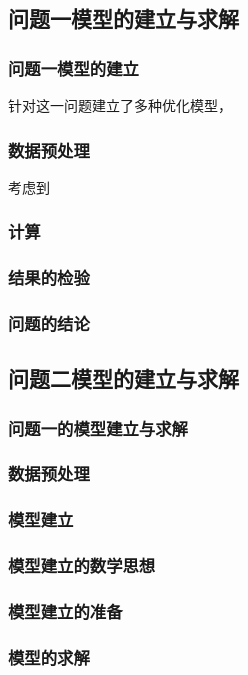 \documentclass{ctexart}
\begin{document}
    \subsection{问题一模型的建立与求解}
    \subsubsection{问题一模型的建立}
针对这一问题建立了多种优化模型，
    
    \subsubsection{数据预处理}
	
考虑到

	\subsubsection{计算}
	\subsubsection{结果的检验}
	\subsubsection{问题的结论}
    \subsection{问题二模型的建立与求解}


\subsubsection{问题一的模型建立与求解}
\subsubsection{数据预处理}
\subsubsection{模型建立}
\subsubsection{模型建立的数学思想}
\subsubsection{模型建立的准备}
\subsubsection{模型的求解}
\end{document}
